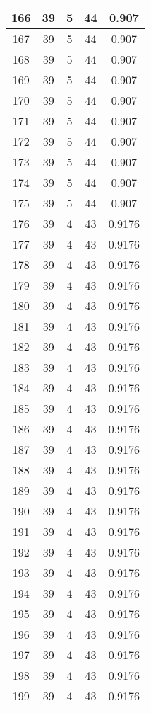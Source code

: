 \documentclass[letterpaper, 12pt]{article}
\begin{document}
\begin{longtable}{|c|c|c|c|c|}
\hline
166 & 39 & 5 & 44 & 0.907 \\
\hline
167 & 39 & 5 & 44 & 0.907 \\
\hline
168 & 39 & 5 & 44 & 0.907 \\
\hline
169 & 39 & 5 & 44 & 0.907 \\
\hline
170 & 39 & 5 & 44 & 0.907 \\
\hline
171 & 39 & 5 & 44 & 0.907 \\
\hline
172 & 39 & 5 & 44 & 0.907 \\
\hline
173 & 39 & 5 & 44 & 0.907 \\
\hline
174 & 39 & 5 & 44 & 0.907 \\
\hline
175 & 39 & 5 & 44 & 0.907 \\
\hline
176 & 39 & 4 & 43 & 0.9176 \\
\hline
177 & 39 & 4 & 43 & 0.9176 \\
\hline
178 & 39 & 4 & 43 & 0.9176 \\
\hline
179 & 39 & 4 & 43 & 0.9176 \\
\hline
180 & 39 & 4 & 43 & 0.9176 \\
\hline
181 & 39 & 4 & 43 & 0.9176 \\
\hline
182 & 39 & 4 & 43 & 0.9176 \\
\hline
183 & 39 & 4 & 43 & 0.9176 \\
\hline
184 & 39 & 4 & 43 & 0.9176 \\
\hline
185 & 39 & 4 & 43 & 0.9176 \\
\hline
186 & 39 & 4 & 43 & 0.9176 \\
\hline
187 & 39 & 4 & 43 & 0.9176 \\
\hline
188 & 39 & 4 & 43 & 0.9176 \\
\hline
189 & 39 & 4 & 43 & 0.9176 \\
\hline
190 & 39 & 4 & 43 & 0.9176 \\
\hline
191 & 39 & 4 & 43 & 0.9176 \\
\hline
192 & 39 & 4 & 43 & 0.9176 \\
\hline
193 & 39 & 4 & 43 & 0.9176 \\
\hline
194 & 39 & 4 & 43 & 0.9176 \\
\hline
195 & 39 & 4 & 43 & 0.9176 \\
\hline
196 & 39 & 4 & 43 & 0.9176 \\
\hline
197 & 39 & 4 & 43 & 0.9176 \\
\hline
198 & 39 & 4 & 43 & 0.9176 \\
\hline
199 & 39 & 4 & 43 & 0.9176 \\
\hline
\end{longtable}
\end{document}
